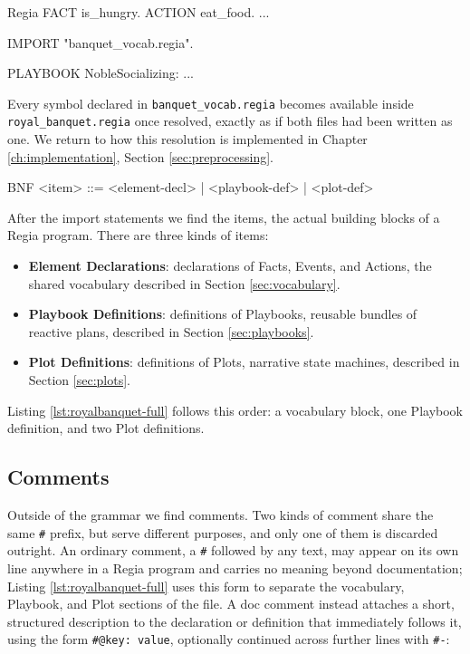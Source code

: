 \begin{codeblock}[]{Regia}
FACT is_hungry.
ACTION eat_food.
...

IMPORT "banquet_vocab.regia".

PLAYBOOK NobleSocializing:
    ...
\end{codeblock}

Every symbol declared in \lstinline|banquet_vocab.regia| becomes available inside \lstinline|royal_banquet.regia| once resolved, exactly as if both files had been written as one. We return to how this resolution is implemented in Chapter \ref{ch:implementation}, Section \ref{sec:preprocessing}.

\begin{codeblock}[]{BNF}
    <item>           ::= <element-decl>
                       | <playbook-def>
                       | <plot-def>
\end{codeblock}

After the import statements we find the items, the actual building blocks of a Regia program. There are three kinds of items:

\begin{itemize}
    \item \textbf{Element Declarations}: declarations of Facts, Events, and Actions, the shared vocabulary described in Section \ref{sec:vocabulary}.
    \item \textbf{Playbook Definitions}: definitions of Playbooks, reusable bundles of reactive plans, described in Section \ref{sec:playbooks}.
    \item \textbf{Plot Definitions}: definitions of Plots, narrative state machines, described in Section \ref{sec:plots}.
\end{itemize}

Listing \ref{lst:royalbanquet-full} follows this order: a vocabulary block, one Playbook definition, and two Plot definitions.

\subsection{Comments}
\label{sec:comments}


Outside of the grammar we find comments. Two kinds of comment share the same \lstinline|#| prefix, but serve different purposes, and only one of them is discarded outright. An ordinary comment, a \lstinline|#| followed by any text, may appear on its own line anywhere in a Regia program and carries no meaning beyond documentation; Listing \ref{lst:royalbanquet-full} uses this form to separate the vocabulary, Playbook, and Plot sections of the file. A doc comment instead attaches a short, structured description to the declaration or definition that immediately follows it, using the form \lstinline|#@key: value|, optionally continued across further lines with \lstinline|#-|:

